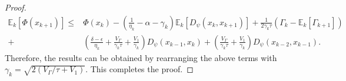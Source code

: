 \documentclass[letterpaper]{article} %
\begin{document}
\begin{proof}
		\[
		\begin{aligned}
			\mathbb{E}_{k}[\Phi(x_{k+1})]\le& \Phi(x_{k}) -\left(\frac{1}{\eta_{k}}-\alpha-\gamma_{k}\right)\mathbb{E}_{k}[D_{\psi}(x_{k},x_{k+1})]+\frac{1}{2\gamma_{k}\tau}(\Gamma_{k}-\mathbb{E}_{k}[\Gamma_{k+1}])\\
			+&\left(\frac{\delta-\epsilon}{\eta_{k}}+\frac{V_{\Gamma}}{\gamma_{k}\tau}+\frac{V_{1}}{\gamma_{k}}\right)D_{\psi}(x_{k-1},x_{k})+\left(\frac{V_{\Gamma}}{\gamma_{k}\tau}+\frac{V_{1}}{\gamma_{k}}\right)D_{\psi}(x_{k-2},x_{k-1}).
		\end{aligned}
		\]
		Therefore, the results can be obtained by  rearranging the above terms  with $\gamma_{k}=\sqrt{2(V_{\Gamma}/\tau+V_{1})}$.
		This completes the proof.
	\end{proof}

\end{document}
